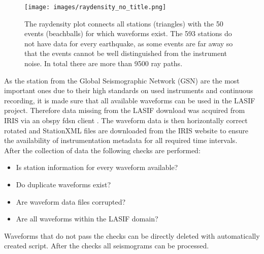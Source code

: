 \begin{figure}[H]
\begin{center}
\texttt{[image: images/raydensity\_no\_title.png]}
\caption[The raydensity plot for the 50 events.]{The raydensity plot connects all stations (triangles) with the 50 
events (beachballs) for which waveforms exist. 
The 593 stations do not have data for every earthquake, as some events are far away so that the events cannot be well
distinguished from the instrument noise. In total there are more than 9500 ray paths.}
\label{raydens}
\end{center}
\end{figure}

As the station from the Global Seismographic Network (GSN) are the most important ones due to their high standards on used 
instruments and continuous recording, it is made sure that all available waveforms can be used in the LASIF project. 
Therefore data missing from the LASIF download was acquired from IRIS via an obspy fdsn client \citep{Krischer2015}. 
The waveform data is then horizontally correct rotated and StationXML files are downloaded from the IRIS website to
ensure the availability of instrumentation metadata for all required time intervals. \\


After the collection of data the following checks are performed:
\begin{itemize}
\item Is station information for every waveform available?
\item Do duplicate waveforms exist?
\item Are waveform data files corrupted?
\item Are all waveforms within the LASIF domain?
\end{itemize}

Waveforms that do not pass the checks can be directly deleted with automatically created script.
After the checks all seismograms can be processed. 



